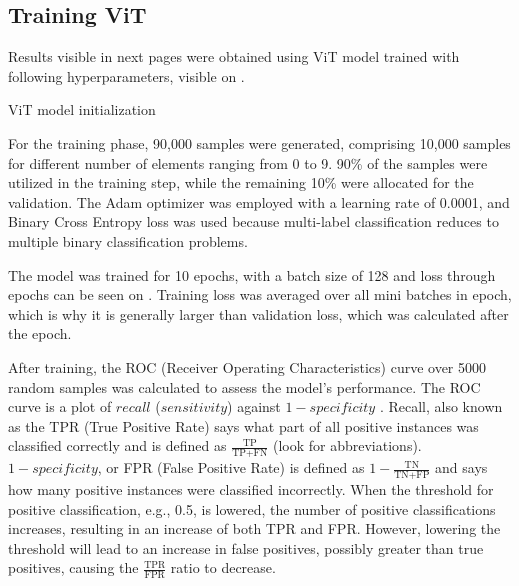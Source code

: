 \subsection{Training ViT}
Results visible in next pages were obtained using ViT model trained with following hyperparameters, visible on .

\newenvironment{longlistingI}{\captionsetup{type=listing, width=0.8\textwidth}}{}
\begin{longlistingI}
    \caption{ViT model initialization}
    \label{lst:vit-hyperparameters}
\end{longlistingI}
\vspace{12pt}

For the training phase, 90,000 samples were generated, comprising 10,000 samples for different number of elements ranging from 0 to 9. 
90\% of the samples were utilized in the training step, while the remaining 10\% were allocated for the validation. 
The Adam optimizer was employed with a learning rate of 0.0001, and Binary Cross Entropy loss was used because multi-label classification reduces to multiple binary classification problems.

The model was trained for 10 epochs, with a batch size of 128 and loss through epochs can be seen on . Training loss was averaged over all mini batches in epoch, which is why it is generally larger than validation loss, which was calculated after the epoch. 

After training, the ROC (Receiver Operating Characteristics) curve over 5000 random samples was calculated to assess the model's performance. 
The ROC curve is a plot of $recall$ ($sensitivity$) against \(1-specificity\) \cite{rocCurve}. 
Recall, also known as the TPR (True Positive Rate) says what part of all positive instances was classified correctly and is defined as \(\frac{\text{TP}}{\text{TP} + \text{FN}}\) (look  for abbreviations).
$1-specificity$, or FPR (False Positive Rate) is defined as \(1 - \frac{\text{TN}}{\text{TN} + \text{FP}}\) and says how many positive instances were classified incorrectly.
When the threshold for positive classification, e.g., 0.5, is lowered, the number of positive classifications increases, resulting in an increase of both TPR and FPR. 
However, lowering the threshold will lead to an increase in false positives, possibly greater than true positives, causing the \(\frac{\text{TPR}}{\text{FPR}}\) ratio to decrease.

